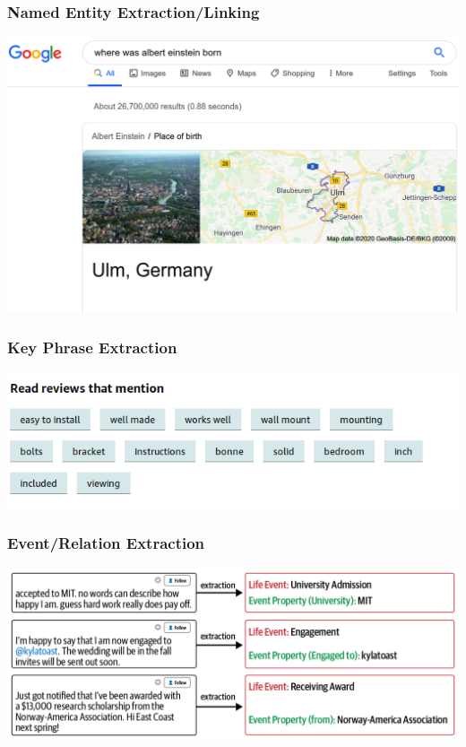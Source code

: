 \documentclass{beamer}
\begin{document}
\begin{frame}
\frametitle{Named Entity Extraction/Linking}
\includegraphics[width=\textwidth]{figures/searchie.png}
\end{frame}


\begin{frame}
\frametitle{Key Phrase Extraction}
\includegraphics[width=\textwidth]{figures/kpe.png}
\end{frame}

\begin{frame}
\frametitle{Event/Relation Extraction}
\includegraphics[width=\textwidth]{figures/eventextraction.png}
\end{frame}
\end{document}
